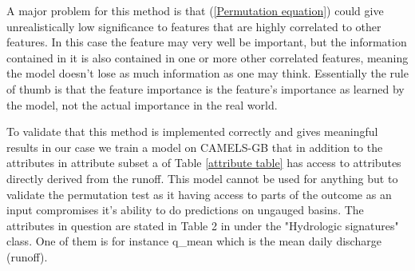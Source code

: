A major problem for this method is that (\ref{Permutation equation}) could give 
unrealistically low significance to features that are highly correlated to other 
features. In this case the feature may very well be important, but the information 
contained in it is also contained in one or more other correlated features, meaning 
the model doesn't lose as much information as one may think. Essentially the rule 
of thumb is that the feature importance is the feature's importance as learned by 
the model, not the actual importance in the real world. 

To validate that this method is implemented correctly and gives meaningful results 
in our case we train a model on CAMELS-GB that in addition to the attributes in 
attribute subset a of Table \ref{attribute table} has access to attributes directly 
derived from the runoff. This model cannot be used for anything but to validate 
the permutation test as it having access to parts of the outcome as an input 
compromises it's ability to do predictions on ungauged basins.  The attributes in 
question are stated in Table 2 in \citet{CAMELS_GB} under the "Hydrologic signatures" 
class. One of them is for instance q\_mean which is the mean daily discharge (runoff).
